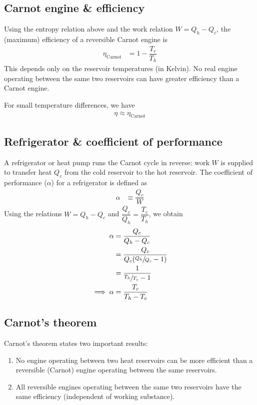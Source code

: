 	\subsection{Carnot engine \& efficiency}
		Using the entropy relation above and the work relation $W=Q_h-Q_c$, the (maximum) efficiency of a reversible Carnot engine is
		\begin{align*}
			\eta_\text{Carnot}&=1-\dfrac{T_c}{T_h}
		\end{align*}
		This depends only on the reservoir temperatures (in Kelvin). No real engine operating between the same two reservoirs can have greater efficiency than a Carnot engine.
		
		For small temperature differences, we have
		\begin{align*}
			\eta\approx\eta_\text{Carnot}
		\end{align*}
		
	\subsection{Refrigerator \& coefficient of performance}
		A refrigerator or heat pump runs the Carnot cycle in reverse: work $W$ is supplied to transfer heat $Q_c$ from the cold reservoir to the hot reservoir. The coefficient of performance ($\alpha$) for a refrigerator is defined as
		\begin{align*}
			\alpha&\equiv\dfrac{Q_c}{W}
		\end{align*}
		Using the relations $W=Q_h-Q_c$ and $\dfrac{Q_c}{Q_h}=\dfrac{T_c}{T_h}$, we obtain
		\begin{align*}
			\alpha&=\dfrac{Q_c}{Q_h-Q_c} \\
			&=\dfrac{Q_c}{Q_c\qty(\sfrac{Q_h}{Q_c}-1)} \\
			&=\dfrac{1}{\sfrac{T_h}{T_c}-1} \\
			\implies\alpha&=\dfrac{T_c}{T_h-T_c}
		\end{align*}
		
	\subsection{Carnot's theorem}
		Carnot's theorem states two important results:
		\begin{enumerate}
			\item No engine operating between two heat reservoirs can be more efficient than a reversible (Carnot) engine operating between the same reservoirs.
			
			\item All reversible engines operating between the same two reservoirs have the same efficiency (independent of working substance).
		\end{enumerate}
		
